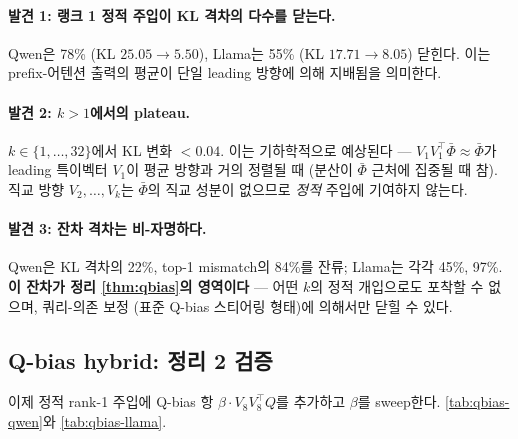 \documentclass{article}
\theoremstyle{definition}
\newcommand{\bphi}{\bar{\Phi}}
\begin{document}
\paragraph{발견 1: 랭크 1 정적 주입이 KL 격차의 다수를 닫는다.}
Qwen은 78\% (KL $25.05\to 5.50$), Llama는 55\% (KL $17.71\to 8.05$) 닫힌다. 이는 prefix-어텐션 출력의 평균이 단일 leading 방향에 의해 지배됨을 의미한다.

\paragraph{발견 2: $k>1$에서의 plateau.}
$k\in\{1, \ldots, 32\}$에서 KL 변화 $<0.04$. 이는 기하학적으로 예상된다 --- $V_1 V_1^\top \bphi \approx \bphi$가 leading 특이벡터 $V_1$이 평균 방향과 거의 정렬될 때 (분산이 $\bphi$ 근처에 집중될 때 참). 직교 방향 $V_2, \ldots, V_k$는 $\bphi$의 직교 성분이 없으므로 \emph{정적} 주입에 기여하지 않는다.

\paragraph{발견 3: 잔차 격차는 비-자명하다.}
Qwen은 KL 격차의 22\%, top-1 mismatch의 84\%를 잔류; Llama는 각각 45\%, 97\%. \textbf{이 잔차가 정리 \ref{thm:qbias}의 영역이다} --- 어떤 $k$의 정적 개입으로도 포착할 수 없으며, 쿼리-의존 보정 (표준 Q-bias 스티어링 형태)에 의해서만 닫힐 수 있다.

\subsection{Q-bias hybrid: 정리 2 검증}
\label{sec:results-hybrid}

이제 정적 rank-1 주입에 Q-bias 항 $\beta\cdot V_8 V_8^\top Q$를 추가하고 $\beta$를 sweep한다. \cref{tab:qbias-qwen}와 \cref{tab:qbias-llama}.
\end{document}
